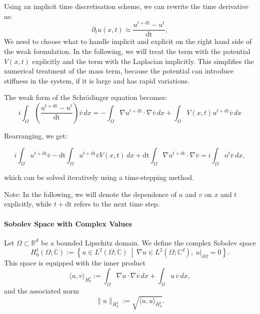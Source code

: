 \documentclass{article}
\theoremstyle{definition}
\theoremstyle{plain}
\theoremstyle{remark}
\newcommand{\dt}{\text{dt}}
\begin{document}
Using an implicit time discretisation scheme, we can rewrite the time derivative as:
\begin{equation}
    \partial_t u(x,t) \approx \frac{u^{t + \dt} - u^t}{\dt},
\end{equation}
We need to choose what to handle implicit and explicit on the right hand side of the weak formulation.
In the following, we will treat the term with the potential $V(x,t)$ explicitly and the term with the Laplacian implicitly.
This simplifies the numerical treatment of the mass term, because the potential can introduce stiffness in the system, if it is large and has rapid variations.


The weak form of the Schrödinger equation becomes:
\begin{equation}
    i \int_{\Omega} \left( \frac{u^{t + \dt} - u^t}{\dt} \right) \bar{v} \, dx = - \int_{\Omega} \nabla u^{t + \dt} \cdot \nabla \bar{v} \, dx + \int_{\Omega} V(x,t) u^{t+\dt} \bar{v} \, dx
\end{equation}

Rearranging, we get:

\begin{equation}
    i \int_{\Omega} u^{t + \dt} \bar{v} - \dt \int_{\Omega}  u^{t+\dt} \bar{v} V(x,t)  \, dx + \dt \int_{\Omega} \nabla u^{t + \dt} \cdot \nabla \bar{v} = i \int_{\Omega} u^t \bar{v} \, dx ,
\end{equation}

which can be solved iteratively using a time-stepping method.

Note: In the following, we will denote the dependence of $u$ and $v$ on $x$ and $t$ explicitly, while $t + \dt$ refers to the next time step.

\paragraph{Sobolev Space with Complex Values}
Let $\Omega \subset \mathbb{R}^d$ be a bounded Lipschitz domain. We define the complex Sobolev space
\[
H_0^1(\Omega; \mathbb{C}) := \left\{ u \in L^2(\Omega; \mathbb{C}) \ \middle| \ \nabla u \in L^2(\Omega; \mathbb{C}^d), \ u|_{\partial \Omega} = 0 \right\}.
\]
This space is equipped with the inner product
\[
\langle u, v \rangle_{H_0^1} := \int_\Omega \nabla u \cdot \nabla \overline{v} \, dx + \int_\Omega u \, \overline{v} \, dx,
\]
and the associated norm
\[
\|u\|_{H_0^1} := \sqrt{ \langle u, u \rangle_{H_0^1} }.
\]
\end{document}

